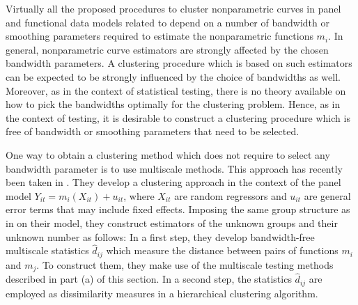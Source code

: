 \documentclass[a4paper,12pt]{article}
\makeatletter
\renewcommand{\eqref}[1]{\tagform@{\ref{#1}}}
\makeatother
\begin{document}
Virtually all the proposed procedures to cluster nonparametric curves in panel and functional data models related to \eqref{eq:model} depend on a number of bandwidth or smoothing parameters required to estimate the nonparametric functions $m_i$. In general, nonparametric curve estimators are strongly affected by the chosen bandwidth parameters. A clustering procedure which is based on such estimators can be expected to be strongly influenced by the choice of bandwidths as well. Moreover, as in the context of statistical testing, there is no theory available on how to pick the bandwidths optimally for the clustering problem. Hence, as in the context of testing, it is desirable to construct a clustering procedure which is free of bandwidth or smoothing parameters that need to be selected. 




One way to obtain a clustering method which does not require to select any bandwidth parameter is to use multiscale methods. This approach has recently been taken in \cite{VogtLinton2018}. They develop a clustering approach in the context of the panel model $Y_{it} = m_i(X_{it}) + u_{it}$, where $X_{it}$ are random regressors and $u_{it}$ are general error terms that may include fixed effects. Imposing the same group structure as in \eqref{eq:model:groups} on their  model, they construct estimators of the unknown groups and their unknown number as follows: In a first step, they develop bandwidth-free multiscale statistics $\hat{d}_{ij}$ which measure the distance between pairs of functions $m_i$ and $m_j$. To construct them, they make use of the multiscale testing methods described in part (a) of this section. In a second step, the statistics $\hat{d}_{ij}$ are employed as dissimilarity measures in a hierarchical clustering algorithm. 


\newpage

{\small
\setlength{\bibsep}{0.55em}
}

\newpage
\end{document}
